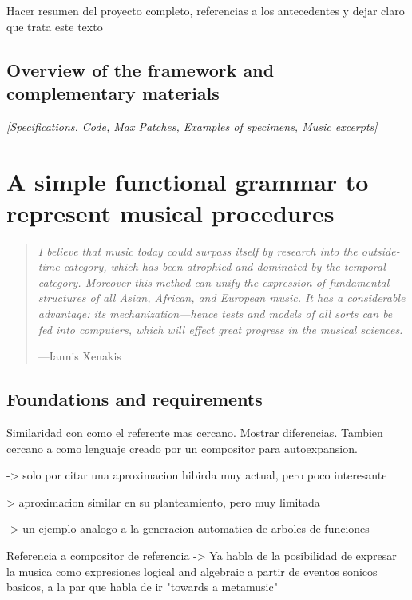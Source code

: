 \documentclass{article}
\begin{document}
Hacer resumen del proyecto completo, referencias a los antecedentes y dejar claro que trata este texto

\subsection{Overview of the framework and complementary materials}

{\color{gray} \textsl{[Specifications. Code, Max Patches, Examples of specimens, Music excerpts]}}




\section{A simple functional grammar to represent musical procedures}

\begin{samepage}
\begin{quotation}
\textsl{I believe that music today could surpass itself by research into the outside-time category, which has been atrophied and dominated by the
temporal category. Moreover this method can unify the expression of
fundamental structures of all Asian, African, and European music. It has a
considerable advantage: its mechanization---hence tests and models of
all sorts can be fed into computers, which will effect great progress in the
musical sciences.}

---Iannis Xenakis \cite{xenakis1971formalized}
\end{quotation}
\end{samepage}


\subsection{Foundations and requirements}








 



{\color{red}
Similaridad con \cite{Hofmann2015} como el referente mas cercano. Mostrar diferencias. Tambien cercano a \cite{ArizaOpenDesign} como lenguaje creado por un compositor para autoexpansion.

\cite{crawford2015algorithmic} -> solo por citar una aproximacion hibirda muy actual, pero poco interesante

\cite{delaPuente2002} > aproximacion similar en su planteamiento, pero muy limitada

\cite{Laine} -> un ejemplo analogo a la generacion automatica de arboles de funciones

Referencia a compositor de referencia -> \cite{xenakis1971formalized}
Ya habla de la posibilidad de expresar la musica como expresiones logical and algebraic a partir de eventos sonicos basicos, a la par que habla de ir "towards a metamusic" 
}
\end{document}
